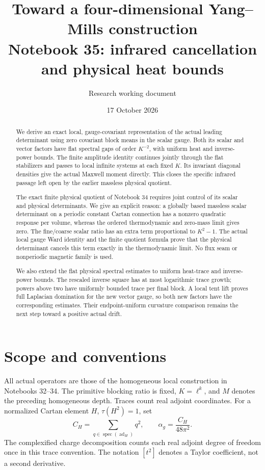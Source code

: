 \documentclass[11pt]{article}
\title{Toward a four-dimensional Yang--Mills construction\\
\large Notebook 35: infrared cancellation and physical heat bounds}
\author{Research working document}
\date{17 October 2026}
\theoremstyle{remark}
\begin{document}
\maketitle
\begin{abstract}
We derive an exact local, gauge-covariant representation
of the actual leading determinant using zero covariant
block means in the scalar gauge. Both its scalar and
vector factors have flat spectral gaps of order
\(K^{-2}\), with uniform heat and inverse-power bounds.
The finite amplitude identity continues jointly through
the flat stabilizers and passes to local infinite
systems at each fixed \(K\). Its invariant diagonal
densities give the actual Maxwell moment directly.
This closes the specific infrared passage left open
by the earlier massless physical quotient.

The exact finite physical quotient of Notebook 34 requires
joint control of its scalar and physical determinants.
We give an explicit reason: a globally based massless
scalar determinant on a periodic constant Cartan connection
has a nonzero quadratic response per volume, whereas the
ordered thermodynamic and zero-mass limit gives zero.
The fine/coarse scalar ratio has an extra term proportional
to \(K^2-1\). The actual local gauge Ward identity and
the finite quotient formula prove that the physical
determinant cancels this term exactly in the thermodynamic
limit. No flux seam or nonperiodic magnetic family is used.

We also extend the flat physical spectral estimates to
uniform heat-trace and inverse-power bounds. The
rescaled inverse square has at most logarithmic trace
growth; powers above two have uniformly bounded trace
per final block. A local tent lift proves full
Laplacian domination for the new vector gauge, so
both new factors have the corresponding estimates.
Their endpoint-uniform curvature comparison remains
the next step toward a positive actual drift.
\end{abstract}

\section*{Scope and conventions}

All actual operators are those of the homogeneous local
construction in Notebooks 32--34. The primitive blocking
ratio is fixed, \(K=\ell^k\), and \(M\) denotes the
preceding homogeneous depth. Traces count real adjoint
coordinates. For a normalized Cartan element \(H\),
\(\tau(H^2)=1\), set
\[
 C_H=\sum_{q\in\operatorname{spec}(\operatorname{ad}_H)}q^2,
 \qquad \alpha_g=\frac{C_H}{48\pi^2}.
\]
The complexified charge decomposition counts each real
adjoint degree of freedom once in this trace convention.
The notation \([t^2]\) denotes a Taylor coefficient,
not a second derivative.
\end{document}
